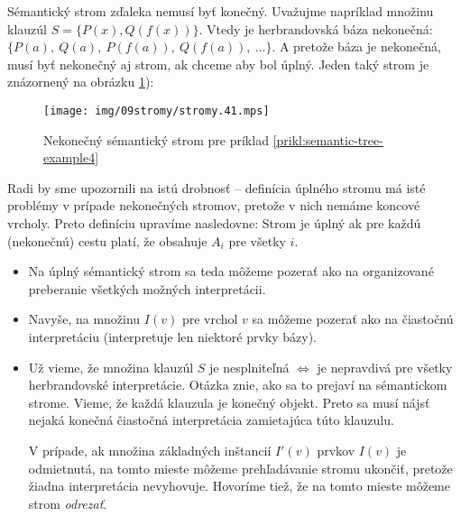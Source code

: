 \begin{priklad}
    \label{prikl:semantic-tree-example4}
    Sémantický strom zďaleka nemusí byť konečný. Uvažujme napríklad množinu
    klauzúl $S=\{P(x), Q(f(x)) \}$.
    Vtedy je herbrandovská báza nekonečná: 
    $\{ P(a),\ Q(a),\ P(f(a)),\ Q(f(a)),\ \ldots \}$.
    A pretože báza je nekonečná, musí byť nekonečný aj strom, ak chceme aby
    bol úplný. Jeden taký strom je znázornený na obrázku
    \ref{fig:semantic-tree-example4}):

    \begin{figure}[h]
        \centering
        \texttt{[image: img/09stromy/stromy.41.mps]}
        \caption{Nekonečný sémantický strom pre príklad
                \ref{prikl:semantic-tree-example4}}
        \label{fig:semantic-tree-example4}
    \end{figure}
\end{priklad}

\begin{poznamka}
    Radi by sme upozornili na istú drobnosť -- definícia úplného stromu má
    isté problémy v prípade nekonečných stromov, pretože v nich nemáme
    koncové vrcholy. Preto definíciu upravíme nasledovne:
    Strom je úplný ak pre každú (nekonečnú) cestu platí, že obsahuje $A_i$
    pre všetky $i$.
\end{poznamka}

\begin{poznamka}
    \noindent
    \begin{itemize}
    \item Na úplný sémantický strom sa teda môžeme pozerať ako na organizované
        preberanie všetkých možných interpretácii.
    \item Navyše, na množinu $I(v)$ pre vrchol $v$ sa môžeme pozerať ako na
        čiastočnú interpretáciu (interpretuje len niektoré prvky bázy).
    \item Už vieme, že množina klauzúl $S$ je nesplniteľná $\iff$
        je nepravdivá pre všetky herbrandovské interpretácie. Otázka znie,
        ako sa to prejaví na sémantickom strome. Vieme, že každá klauzula
        je konečný objekt. Preto sa musí nájsť nejaká konečná čiastočná
        interpretácia zamietajúca túto klauzulu.

        V prípade, ak množina základných inštancií $I'(v)$ prvkov $I(v)$
        je odmietnutá, na tomto mieste môžeme prehľadávanie stromu ukončiť,
        pretože žiadna interpretácia nevyhovuje. Hovoríme tiež,
        že na tomto mieste môžeme strom \emph{odrezať}.
    \end{itemize}
\end{poznamka}

